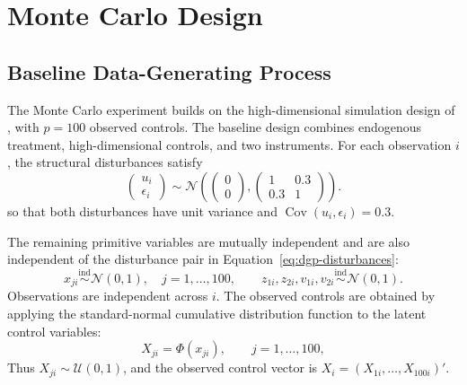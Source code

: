 \section{Monte Carlo Design}
\label{chap:monte-carlo-design}

\subsection{Baseline Data-Generating Process}
\label{sec:monte-carlo-design}

The Monte Carlo experiment builds on the high-dimensional simulation design of \textcite{chen_huang_tien_2021}, with \(p=100\) observed controls. The baseline design combines endogenous treatment, high-dimensional controls, and two instruments. For each observation \(i\), the structural disturbances satisfy
\begin{equation}
  \begin{pmatrix}
    u_i \\
    \epsilon_i
  \end{pmatrix}
  \sim
  \mathcal{N}\!\left(
    \begin{pmatrix} 0 \\ 0 \end{pmatrix},
    \begin{pmatrix} 1 & 0.3 \\ 0.3 & 1 \end{pmatrix}
  \right).
  \label{eq:dgp-disturbances}
\end{equation}
so that both disturbances have unit variance and
\(\operatorname{Cov}(u_i,\epsilon_i)=0.3\).

The remaining primitive variables are mutually independent and are also independent of the disturbance pair in Equation~\eqref{eq:dgp-disturbances}:
\begin{equation}
  x_{ji}\overset{\mathrm{ind}}{\sim}\mathcal{N}(0,1),
  \quad j=1,\ldots,100,
  \qquad
  z_{1i},z_{2i},v_{1i},v_{2i}
  \overset{\mathrm{ind}}{\sim}\mathcal{N}(0,1).
  \label{eq:dgp-primitives}
\end{equation}
Observations are independent across \(i\). The observed controls are obtained by applying the standard-normal cumulative distribution function to the latent control variables:
\begin{equation}
  X_{ji}=\Phi(x_{ji}),
  \qquad j=1,\ldots,100,
  \label{eq:dgp-controls}
\end{equation}
Thus \(X_{ji}\sim\mathcal{U}(0,1)\), and the observed control vector is
\(X_i=(X_{1i},\ldots,X_{100i})'\).

